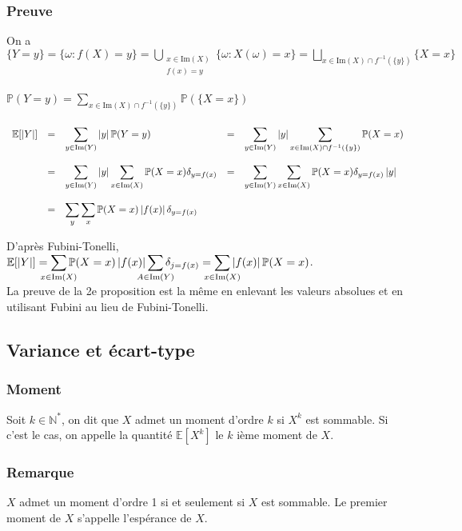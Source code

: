 \documentclass[a4paper,10pt]{book} %
\newcommand{\N}{\mathbb{N}}
\newcommand{\E}{\mathbb{E}} %
\renewcommand{\P}{\mathbb{P}} %
\newcommand\abs[1]{\left|#1\right|}
\newcommand{\Ima}{\mathrm{Im}} %
\begin{document}
\subsubsection{Preuve}
On a $\displaystyle \{Y=y\}=\{\omega : f(X)=y\}=\bigcup_{\substack{x\in \Ima(X)\\f(x)=y}}\{\omega : X(\omega) = x\}=\bigsqcup_{x\in \Ima(X)\cap f^{-1}(\{y\})}\{X=x\}$\\\\

$\displaystyle \P(Y=y)=\sum_{x\in \Ima(X)\cap f^{-1}(\{y\})}\P(\{X=x\})$\\\\

$\begin{array}{rclll}
\E[\abs{Y}] &=&\displaystyle \sum_{y\in \Ima(Y)}\abs{y}\P(Y=y)\displaystyle &=& \displaystyle\sum_{y\in \Ima(Y)}\abs{y}\sum_{x\in\Ima(X)\cap f^{-1}(\{y\})}\P(X=x)\\\\
&=& \displaystyle \sum_{y\in \Ima(Y)}\abs{y}\sum_{x\in\Ima(X)}\P(X=x)\delta_{y=f(x)}&=& \displaystyle \sum_{y\in \Ima(Y)}\sum_{x\in\Ima(X)}\P(X=x)\delta_{y=f(x)}\abs{y} \\\\
&=& \displaystyle \sum_y\sum_x\P(X=x)\abs{f(x)} \delta_{y=f(x)}
\end{array}$

D'après Fubini-Tonelli, $\displaystyle\E[\abs{Y}]=\sum_{\mathclap{x\in \Ima(X)}}\P(X=x)\abs{f(x)}\sum_{\mathclap{A\in \Ima(Y)}}\delta_{j=f(x)}=\sum_{\mathclap{x\in \Ima(X)}}\abs{f(x)}\P(X=x)$.\\

La preuve de la 2e proposition est la même en enlevant les valeurs absolues et en utilisant Fubini au lieu de Fubini-Tonelli.

\subsection{Variance et écart-type}
\subsubsection{Moment}
Soit $k\in \N^*$, on dit que $X$ admet un moment d'ordre $k$ si $X^k$ est sommable. Si c'est le cas, on appelle la quantité $\E[X^k]$ le $k$ ième moment de $X$.

\subsubsection{Remarque}
$X$ admet un moment d'ordre 1 si et seulement si $X$ est sommable. Le premier moment de $X$ s'appelle l'espérance de $X$.
\end{document}
